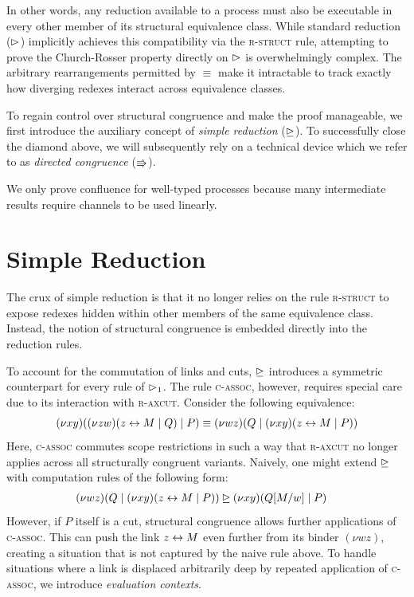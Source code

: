 In other words, any reduction available to a process must also be executable
in every other member of its structural equivalence class.
While standard reduction ($\rhd$) implicitly achieves this compatibility
via the \textsc{r-struct} rule, attempting to prove the Church-Rosser
property directly on $\rhd$ is overwhelmingly complex. The arbitrary
rearrangements permitted by $\equiv$ make it intractable to track exactly how
diverging redexes interact across equivalence classes.

To regain control over structural congruence and make the proof manageable,
we first introduce the auxiliary concept of \emph{simple reduction} ($\unrhd$). To successfully
close the diamond above, we will subsequently rely on a technical device
which we refer to as \emph{directed congruence} ($\Rrightarrow$).

\begin{remark}
  We only prove confluence for well-typed processes because many intermediate
  results require channels to be used linearly.
\end{remark}

\section{Simple Reduction}
The crux of simple reduction is that it no longer relies on the rule \textsc{r-struct}
to expose redexes hidden within other members of the same equivalence class.
Instead, the notion of structural congruence is embedded directly into the
reduction rules.

To account for the commutation of links and cuts, $\unrhd$ introduces
a symmetric counterpart for every rule of $\rhd_1$. The rule \textsc{c-assoc},
however, requires special care due to its interaction with \textsc{r-axcut}.
Consider the following equivalence:
\[
  (\nu x y)((\nu z w)(z \leftrightarrow M \mid Q) \mid P) \equiv
  (\nu w z)(Q \mid (\nu x y)(z \leftrightarrow M \mid P))
\]
Here, \textsc{c-assoc} commutes scope restrictions in such a way that
\textsc{r-axcut} no longer applies across all structurally congruent variants.
Naively, one might extend $\unrhd$ with computation rules of the following form:
\begin{align*}
  (\nu w z)(Q \mid (\nu x y)(z \leftrightarrow M \mid P))
  &\unrhd (\nu x y)(Q[M/w] \mid P)
\end{align*}
However, if $P$ itself is a cut, structural congruence allows further
applications of \textsc{c-assoc}. This can push the link $z \leftrightarrow M$ even
further from its binder $(\nu w z)$, creating a situation that is not captured
by the naive rule above. To handle situations where a link is displaced
arbitrarily deep by repeated application of \textsc{c-assoc}, we introduce
\emph{evaluation contexts}.

